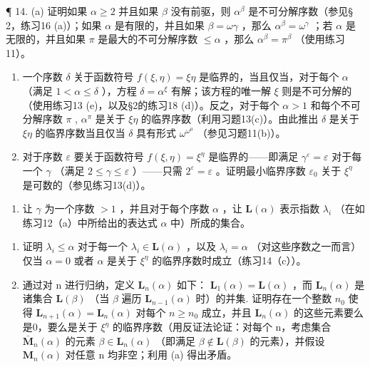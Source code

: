 ¶ 14. (a) 证明如果 \(\alpha \geqslant 2\) 并且如果 \(\beta\) 没有前驱，则 \(\alpha^{\beta}\) 是不可分解序数（参见§ 2，练习16 (a)）；如果 \(\alpha\) 是有限的，并且如果 \(\beta = \omega \gamma\) ，那么 \(\alpha^{\beta} = \omega^{\gamma}\) ；若 \(\alpha\) 是无限的，并且如果 \(\pi\) 是最大的不可分解序数 \(\leqslant \alpha\) ，那么 \(\alpha^{\beta} = \pi^{\beta}\) （使用练习11）。

\begin{enumerate}
\def\labelenumi{(\alph{enumi})}
\setcounter{enumi}{1}
\item
  一个序数 \(\delta\) 关于函数符号 \(f(\xi, \eta) = \xi \eta\) 是临界的，当且仅当，对于每个 \(\alpha\) （满足 \(1 < \alpha \leqslant \delta\) ），方程 \(\delta = \alpha^{\xi}\) 有解；该方程的唯一解 \(\xi\) 则是不可分解的（使用练习13 (e)，以及§2的练习18 (d)）。反之，对于每个 \(\alpha > 1\) 和每个不可分解序数 \(\pi\) , \(\alpha^{\pi}\) 是关于 \(\xi \eta\) 的临界序数（利用习题13(c)）。由此推出 \(\delta\) 是关于 \(\xi \eta\) 的临界序数当且仅当 \(\delta\) 具有形式 \(\omega^{\omega^{\mu}}\) （参见习题11(b)）。
\item
  对于序数 \(\varepsilon\) 要关于函数符号 \(f(\xi, \eta) = \xi^{\eta}\) 是临界的——即满足 \(\gamma^{\varepsilon} = \varepsilon\) 对于每一个 \(\gamma\) （满足 \(2 \leqslant \gamma \leqslant \varepsilon\) ）——只需 \(2^{\varepsilon} = \varepsilon\) 。证明最小临界序数 \(\varepsilon_0\) 关于 \(\xi^{\eta}\) 是可数的（参见练习13(d)）。
\end{enumerate}

\begin{enumerate}
\def\labelenumi{\arabic{enumi}.}
\setcounter{enumi}{14}
\tightlist
\item
  让 \(\gamma\) 为一个序数 \(>1\) ，并且对于每个序数 \(\alpha\) ，让 \(\mathbf{L}(\alpha)\) 表示指数 \(\lambda_{i}\) （在如练习12（a）中所给出的表达式 \(\alpha\) 中）所成的集合。
\end{enumerate}

\begin{enumerate}
\def\labelenumi{(\alph{enumi})}
\item
  证明 \(\lambda_{i} \leqslant \alpha\) 对于每一个 \(\lambda_{i} \in \mathbf{L}(\alpha)\) ，以及 \(\lambda_{i} = \alpha\) （对这些序数之一而言）仅当 \(\alpha = 0\) 或者 \(\alpha\) 是关于 \(\xi^{\eta}\) 的临界序数时成立（练习14（c））。
\item
  通过对 n 进行归纳，定义 \(\mathbf{L}_{n}(\alpha)\) 如下： \(\mathbf{L}_{1}(\alpha)=\mathbf{L}(\alpha)\) ，而 \(\mathbf{L}_{n}(\alpha)\) 是诸集合 \(\mathbf{L}(\beta)\) （当 \(\beta\) 遍历 \(\mathbf{L}_{n-1}(\alpha)\) 时）的并集. 证明存在一个整数 \(n_{0}\) 使得 \(\mathbf{L}_{n+1}(\alpha)=\mathbf{L}_{n}(\alpha)\) 对每个 \(n\geqslant n_{0}\) 成立，并且 \(\mathbf{L}_{n}(\alpha)\) 的这些元素要么是0，要么是关于 \(\xi^{\eta}\) 的临界序数（用反证法论证：对每个 n，考虑集合 \(\bar{\mathbf{M}}_{n}(\alpha)\) 的元素 \(\beta\in\mathbf{L}_{n}(\alpha)\) （即满足 \(\beta\notin\mathbf{L}(\beta)\) 的元素），并假设 \(\mathbf{M}_{n}(\alpha)\) 对任意 n 均非空；利用 (a) 得出矛盾。
\end{enumerate}

